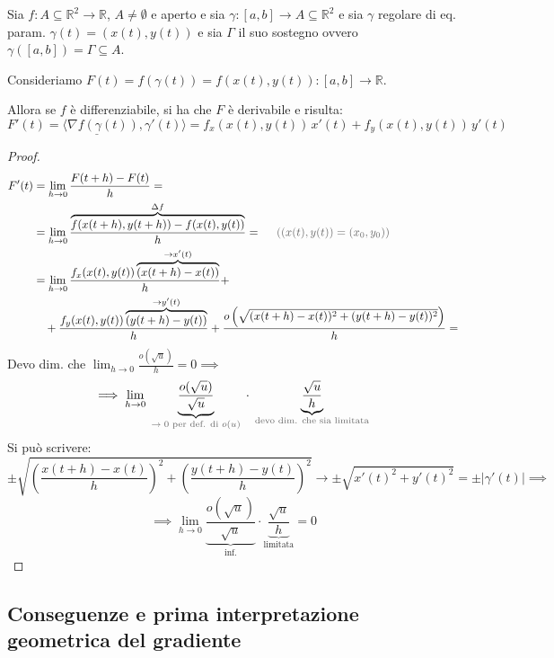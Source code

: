 
\begin{theorem}
Sia $f : A \subseteq \mathbb{R}^2 \to \mathbb{R}$, $A \neq \emptyset$ e aperto e sia $\gamma : [a, b] \to A \subseteq \mathbb{R}^2$ e sia $\gamma$ regolare di eq. param. $\gamma(t) = (x(t), y(t))$ e sia $\Gamma$ il suo sostegno ovvero $\gamma([a, b]) = \Gamma \subseteq A$.

Consideriamo $F(t) = f(\gamma(t)) = f(x(t), y(t)) : [a, b] \to \mathbb{R}$.

Allora se $f$ è differenziabile, si ha che $F$ è derivabile e risulta:
\[
\underline{F'(t) = \langle \nabla f(\gamma(t)), \gamma'(t) \rangle} = f_x(x(t), y(t))\, x'(t) + f_y(x(t), y(t))\, y'(t)
\]
\end{theorem}

\begin{proof}
\[
\begin{aligned}
F'(t) &= \lim_{h \to 0} \frac{F(t + h) - F(t)}{h} = \\
&= \lim_{h \to 0} \frac{\overbrace{f(x(t + h), y(t + h)) - f(x(t), y(t))}^{\Delta f}}{h} = \quad \text{\pencilnote{($(x(t), y(t)) = (x_0, y_0)$)}} \\
&= \lim_{h \to 0} \frac{f_x(x(t), y(t))\overbrace{(x(t + h) - x(t))}^{\to x'(t)}}{h} + \\
&\quad + \frac{f_y(x(t), y(t))\overbrace{(y(t + h) - y(t))}^{\to y'(t)}}{h} + \frac{o\left(\sqrt{(x(t + h) - x(t))^2 + (y(t + h) - y(t))^2}\right)}{h} =
\end{aligned}
\]
Devo dim. che $\lim_{h \to 0} \frac{o(\sqrt{u})}{h} = 0 \implies$
\[
\implies \lim_{h \to 0} \underbrace{\frac{o(\sqrt{u})}{\sqrt{u}}}_{\text{\pencilnote{$\to 0$ per def. di $o(u)$}}} \cdot \underbrace{\frac{\sqrt{u}}{h}}_{\text{\pencilnote{devo dim. che sia limitata}}}
\]
Si può scrivere:
\[
\pm \sqrt{\left(\frac{x(t + h) - x(t)}{h}\right)^2 + \left(\frac{y(t + h) - y(t)}{h}\right)^2} \to \pm \sqrt{x'(t)^2 + y'(t)^2} = \pm \vert \gamma'(t) \vert \implies
\]
\[
\implies \lim_{h \to 0} \underbrace{\frac{o(\sqrt{u})}{\sqrt{u}}}_{\text{inf.}} \cdot \underbrace{\frac{\sqrt{u}}{h}}_{\text{limitata}} = 0
\]
\end{proof}

\subsection{Conseguenze e prima interpretazione geometrica del gradiente}


